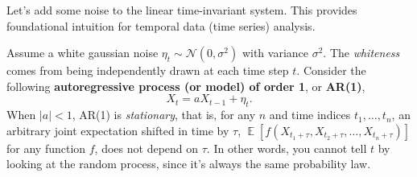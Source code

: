 \documentclass[a4paper,11pt]{exam}
\DeclareMathOperator*{\E}{\mathbb{E}} %
\newcommand{\system}[2]{\mathcal{#1}\left[ #2 \right]}
\begin{document}
\begin{questions}

Let's add some noise to the linear time-invariant system.
This provides foundational intuition for temporal data (time series) analysis.

\question Assume a white gaussian noise $\eta_t \sim \mathcal{N}(0, \sigma^2)$ with variance $\sigma^2$.
The \textit{whiteness} comes from being independently drawn at each time step $t$.
Consider the following \textbf{autoregressive process (or model) of order 1}, or \textbf{AR(1)},
\begin{equation}\label{eq:ar1}
    X_t = a X_{t-1} + \eta_t.
\end{equation}
When $|a| < 1$, AR(1) is \emph{stationary}, that is, for any $n$ and time indices $t_1, \ldots, t_n$, an arbitrary joint expectation shifted in time by $\tau$, $\E[f(X_{t_1+\tau}, X_{t_2+\tau}, \ldots, X_{t_n+\tau})]$ for any function $f$, does not depend on $\tau$.
In other words, you cannot tell $t$ by looking at the random process, since it's always the same probability law.

\end{questions}
\end{document}
